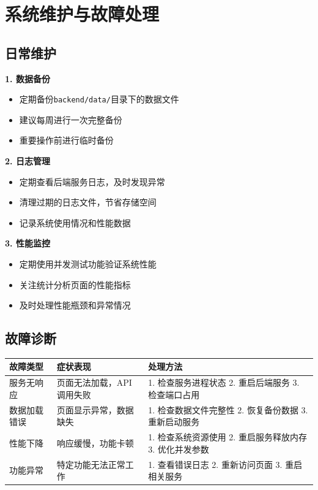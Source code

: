 \documentclass[12pt, a4paper]{article}
\begin{document}
\section{系统维护与故障处理}

\subsection{日常维护}

\begin{stepbox}[title={定期维护任务}]
\textbf{1. 数据备份}
\begin{itemize}[nosep]
    \item 定期备份\texttt{backend/data/}目录下的数据文件
    \item 建议每周进行一次完整备份
    \item 重要操作前进行临时备份
\end{itemize}

\textbf{2. 日志管理}
\begin{itemize}[nosep]
    \item 定期查看后端服务日志，及时发现异常
    \item 清理过期的日志文件，节省存储空间
    \item 记录系统使用情况和性能数据
\end{itemize}

\textbf{3. 性能监控}
\begin{itemize}[nosep]
    \item 定期使用并发测试功能验证系统性能
    \item 关注统计分析页面的性能指标
    \item 及时处理性能瓶颈和异常情况
\end{itemize}
\end{stepbox}

\subsection{故障诊断}

\begin{table}[H]
\centering
\begin{longtable}{|p{3cm}|p{4cm}|p{6cm}|}
\hline
\rowcolor{error!20}
\textbf{故障类型} & \textbf{症状表现} & \textbf{处理方法} \\
\hline
\endhead
服务无响应 & 页面无法加载，API调用失败 & 1. 检查服务进程状态 2. 重启后端服务 3. 检查端口占用 \\
\hline
\rowcolor{light}
数据加载错误 & 页面显示异常，数据缺失 & 1. 检查数据文件完整性 2. 恢复备份数据 3. 重新启动服务 \\
\hline
性能下降 & 响应缓慢，功能卡顿 & 1. 检查系统资源使用 2. 重启服务释放内存 3. 优化并发参数 \\
\hline
\rowcolor{light}
功能异常 & 特定功能无法正常工作 & 1. 查看错误日志 2. 重新访问页面 3. 重启相关服务 \\
\hline
\end{longtable}
\end{table}
\end{document}
